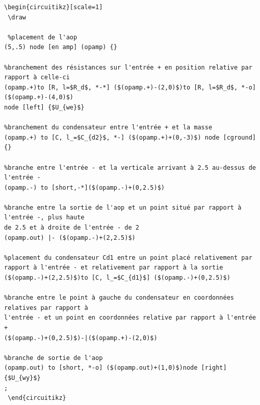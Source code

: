 \documentclass[10pt]{article}
\begin{document}
\begin{verbatim}
\begin{circuitikz}[scale=1]
 \draw
 
 %placement de l'aop
(5,.5) node [en amp] (opamp) {}

%branchement des résistances sur l'entrée + en position relative par rapport à celle-ci
(opamp.+)to [R, l=$R_d$, *-*] ($(opamp.+)-(2,0)$)to [R, l=$R_d$, *-o]($(opamp.+)-(4,0)$)
node [left] {$U_{we}$}

%branchement du condensateur entre l'entrée + et la masse
(opamp.+) to [C, l_=$C_{d2}$, *-] ($(opamp.+)+(0,-3)$) node [cground] {}

%branche entre l'entrée - et la verticale arrivant à 2.5 au-dessus de l'entrée -
(opamp.-) to [short,-*]($(opamp.-)+(0,2.5)$)

%branche entre la sortie de l'aop et un point situé par rapport à l'entrée -, plus haute
de 2.5 et à droite de l'entrée - de 2
(opamp.out) |- ($(opamp.-)+(2,2.5)$)

%placement du condensateur Cd1 entre un point placé relativement par rapport à l'entrée - et relativement par rapport à la sortie
($(opamp.-)+(2,2.5)$)to [C, l_=$C_{d1}$] ($(opamp.-)+(0,2.5)$)

%branche entre le point à gauche du condensateur en coordonnées relatives par rapport à
l'entrée - et un point en coordonnées relative par rapport à l'entrée +
($(opamp.-)+(0,2.5)$)-|($(opamp.+)-(2,0)$)
 
%branche de sortie de l'aop
(opamp.out) to [short, *-o] ($(opamp.out)+(1,0)$)node [right] {$U_{wy}$}
;
 \end{circuitikz}
\end{verbatim}
\end{document}
